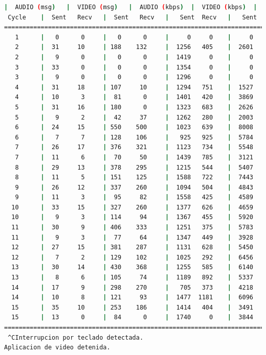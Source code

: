 \begin{lstlisting}[language=bash,basicstyle=\ttfamily\scriptsize]
          |  AUDIO (msg)   |  VIDEO (msg)   |  AUDIO (kbps)  |  VIDEO (kbps)  |   CPU (%)
 Cycle    |  Sent   Recv   |  Sent   Recv   |   Sent  Recv   |   Sent  Recv   | Program System
============================================================================================
   1      |   0      0     |   0      0     |     0     0    |     0     0    |   0      0
   2      |  31     10     | 188    132     |  1256   405    |  2601   1828   |  38     64
   2      |   9      0     |   0      0     |  1419     0    |     0      0   |  48     68
   3      |  33      0     |   0      0     |  1354     0    |     0      0   |  41     71
   3      |   9      0     |   0      0     |  1296     0    |     0      0   |  30     71
   4      |  31     18     | 107     10     |  1294   751    |  1527    139   |  24     72
   4      |  10      3     |  81      0     |  1401   420    |  3869      0   |  55     69
   5      |  31     16     | 180      0     |  1323   683    |  2626      0   |  27     70
   5      |   9      2     |  42     37     |  1262   280    |  2003   1774   |  38     71
   6      |  24     15     | 550    500     |  1023   639    |  8008   7283   |  42     72
   6      |   7      7     | 128    106     |   925   925    |  5784   4779   |  24     71
   7      |  26     17     | 376    321     |  1123   734    |  5548   4735   |  32     72
   7      |  11      6     |  70     50     |  1439   785    |  3121   2226   |  31     75
   8      |  29     13     | 378    295     |  1215   544    |  5407   4218   |  39     75
   8      |  11      5     | 151    125     |  1588   722    |  7443   6171   |  26     73
   9      |  26     12     | 337    260     |  1094   504    |  4843   3736   |  30     71
   9      |  11      3     |  95     82     |  1558   425    |  4589   3971   |  38     71
  10      |  33     15     | 327    260     |  1377   626    |  4659   3703   |  42     76
  10      |   9      3     | 114     94     |  1367   455    |  5920   4869   |  32     76
  11      |  30      9     | 406    333     |  1251   375    |  5783   4742   |  47     73
  11      |   9      3     |  77     64     |  1347   449    |  3928   3263   |  27     71
  12      |  27     15     | 381    287     |  1131   628    |  5450   4103   |  39     73
  12      |   7      2     | 129    102     |  1025   292    |  6456   5105   |  26     72
  13      |  30     14     | 430    368     |  1255   585    |  6140   5253   |  28     74
  13      |   8      6     | 105     74     |  1189   892    |  5337   3749   |  40     74
  14      |  17      9     | 298    270     |   705   373    |  4218   3824   |  32     74
  14      |  10      8     | 121     93     |  1477  1181    |  6096   4694   |  45     74
  15      |  35     10     | 253    186     |  1414   404    |  3491   2563   |  19     73
  15      |  13      0     |  84      0     |  1740     0    |  3844      0   |  32     73
============================================================================================
 ^CInterrupcion por teclado detectada.
Aplicacion de video detenida.


\end{lstlisting}
